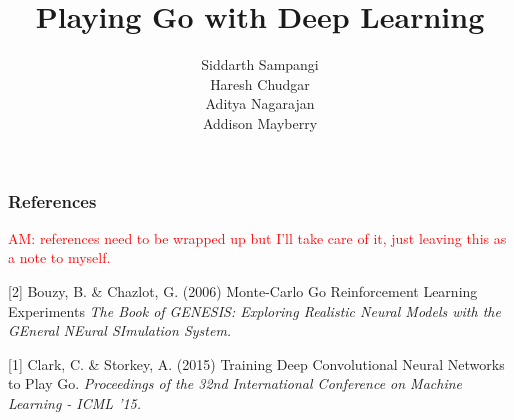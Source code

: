 \documentclass{article} %
\title{Playing Go with Deep Learning}
\author{
Siddarth Sampangi \\
\And
Haresh Chudgar \\
\AND
Aditya Nagarajan \\
\And
Addison Mayberry \\
}
\begin{document}
\maketitle













\subsubsection*{References}

\textcolor{red}{AM: references need to be wrapped up but I'll take care of it, just leaving this as a note to myself.}

\small{
[2] Bouzy, B. \& Chazlot, G. (2006) Monte-Carlo Go Reinforcement Learning Experiments {\it The Book of GENESIS: Exploring
Realistic Neural Models with the GEneral NEural SImulation System.}

[1] Clark, C. \& Storkey, A. (2015) Training Deep Convolutional Neural Networks to Play Go. {\it Proceedings of the 32nd International Conference on Machine Learning - ICML '15.}
}
\end{document}
